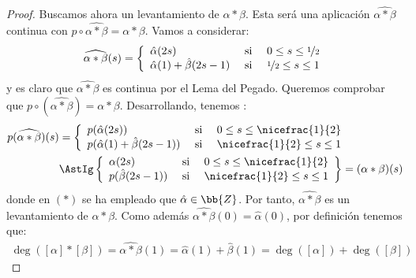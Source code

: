 \begin{teo}
\begin{proof}
        Buscamos ahora un levantamiento de $\alpha \ast \beta$. Esta será una aplicación $\widehat{\alpha \ast \beta}$ continua con $p\circ \widehat{\alpha \ast \beta} = \alpha \ast \beta$. Vamos a considerar:
        \begin{gather*}
            \widehat{\alpha \ast \beta}(s) = \left\{
                \begin{array}{l c c}
                    \hat{\alpha}(2s) & \text{ si } & 0 \leq s \leq \nicefrac{1}{2}\\
                    \hat{\alpha}(1) + \hat{\beta}(2s-1) & \text{ si } &\nicefrac{1}{2} \leq s \leq 1
                \end{array}
            \right.
        \end{gather*}
        y es claro que $\widehat{\alpha \ast \beta}$ es continua por el Lema del Pegado. Queremos comprobar que $p\circ (\widehat{\alpha\ast \beta}) = \alpha \ast \beta$. Desarrollando, tenemos :
        \begin{align*}
            p(\widehat{\alpha \ast \beta})(s) &= \left\{
                \begin{array}{l c c}
                    p(\hat{\alpha}(2s)) & \text{ si } & 0 \leq s \leq \nicefrac{1}{2}\\
                    p(\hat{\alpha}(1) + \hat{\beta}(2s-1)) & \text{ si } &\nicefrac{1}{2} \leq s \leq 1
                \end{array}
            \right.\\
            &\AstIg \left\{
                \begin{array}{l c c}
                    \alpha(2s) & \text{ si } & 0 \leq s \leq \nicefrac{1}{2}\\
                    p(\hat{\beta}(2s-1)) & \text{ si } &\nicefrac{1}{2} \leq s \leq 1
                \end{array}
            \right\} = (\alpha \ast \beta)(s)
        \end{align*}
        donde en $(\ast)$ se ha empleado que $\hat{\alpha}\in \bb{Z}$. Por tanto, $\widehat{\alpha\ast\beta}$ es un levantamiento de $\alpha \ast \beta$. Como además $\widehat{\alpha \ast \beta}(0) = \widehat{\alpha}(0)$, por definición tenemos que:
        \begin{gather*}
            \deg([\alpha] \ast [\beta]) = \widehat{\alpha \ast \beta}(1) = \hat{\alpha}(1) + \hat{\beta}(1) = \deg([\alpha]) + \deg([\beta])
        \end{gather*}
    \end{proof}
\end{teo}

